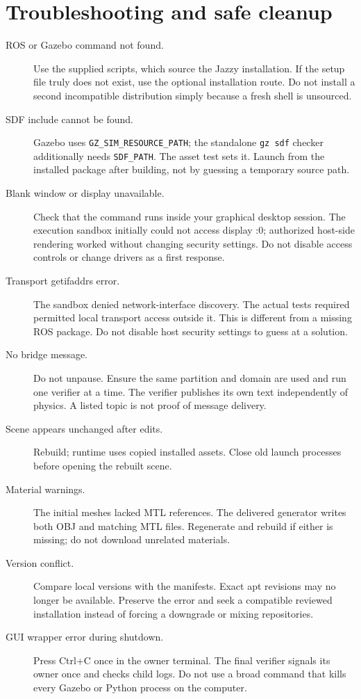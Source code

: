\section{Troubleshooting and safe cleanup}
\begin{description}
\item[ROS or Gazebo command not found.] Use the supplied scripts, which source the Jazzy installation. If the setup file truly does not exist, use the optional installation route. Do not install a second incompatible distribution simply because a fresh shell is unsourced.
\item[SDF include cannot be found.] Gazebo uses \texttt{GZ\_SIM\_RESOURCE\_PATH}; the standalone \texttt{gz sdf} checker additionally needs \texttt{SDF\_PATH}. The asset test sets it. Launch from the installed package after building, not by guessing a temporary source path.
\item[Blank window or display unavailable.] Check that the command runs inside your graphical desktop session. The execution sandbox initially could not access display :0; authorized host-side rendering worked without changing security settings. Do not disable access controls or change drivers as a first response.
\item[Transport getifaddrs error.] The sandbox denied network-interface discovery. The actual tests required permitted local transport access outside it. This is different from a missing ROS package. Do not disable host security settings to guess at a solution.
\item[No bridge message.] Do not unpause. Ensure the same partition and domain are used and run one verifier at a time. The verifier publishes its own text independently of physics. A listed topic is not proof of message delivery.
\item[Scene appears unchanged after edits.] Rebuild; runtime uses copied installed assets. Close old launch processes before opening the rebuilt scene.
\item[Material warnings.] The initial meshes lacked MTL references. The delivered generator writes both OBJ and matching MTL files. Regenerate and rebuild if either is missing; do not download unrelated materials.
\item[Version conflict.] Compare local versions with the manifests. Exact apt revisions may no longer be available. Preserve the error and seek a compatible reviewed installation instead of forcing a downgrade or mixing repositories.
\item[GUI wrapper error during shutdown.] Press Ctrl+C once in the owner terminal. The final verifier signals its owner once and checks child logs. Do not use a broad command that kills every Gazebo or Python process on the computer.
\end{description}

